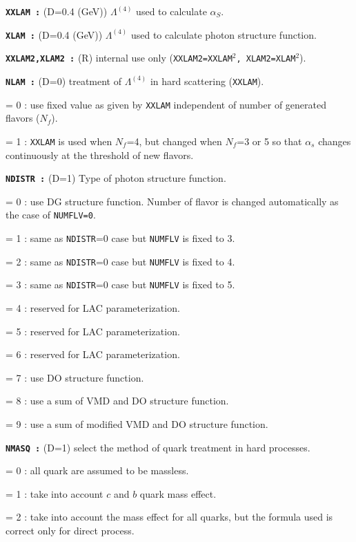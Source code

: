 \begin{list}{ }{\parsep=0pt \itemsep=0pt \topsep=0pt }
\item[\bf \tt XXLAM :] (D=0.4 (GeV)) $\Lambda^{(4)}$ used to
calculate  $\alpha_S$.

\item[\bf \tt XLAM :] (D=0.4 (GeV)) $\Lambda^{(4)}$ used to
calculate  photon structure function.

\item[\bf \tt XXLAM2,XLAM2 :] (R) internal use only
({\tt XXLAM2=XXLAM$^2$, XLAM2=XLAM$^2$}).

\item[\bf \tt NLAM :] (D=0) treatment of $\Lambda^{(4)}$ in hard
scattering ({\tt XXLAM}).
  \begin{list}{}{\itemsep=0pt \parsep=0pt \topsep=0pt}
  \item[= 0 :] use fixed value as given by {\tt XXLAM} independent 
  of number of generated flavors ($N_f$).
  \item[= 1 :] {\tt XXLAM} is used when $N_f$=4, but changed when $N_f$=3 
or 5 so that $\alpha_s$ changes continuously at the threshold of 
new flavors.
  \end{list}

\item[\bf \tt NDISTR :] (D=1) Type of photon structure function.
  \begin{list}{}{\itemsep=0pt \parsep=0pt \topsep=0pt}
  \item[= 0 :] use DG structure function\cite{DG}. Number of flavor
is changed automatically as the case of {\tt NUMFLV=0}.
  \item[= 1 :] same as {\tt NDISTR}=0 case  but {\tt NUMFLV} is fixed
to 3.
  \item[= 2 :] same as {\tt NDISTR}=0 case  but {\tt NUMFLV} is fixed to 4.
  \item[= 3 :] same as {\tt NDISTR}=0 case  but {\tt NUMFLV} is fixed to 5.
  \item[= 4 :] reserved for LAC\cite{LAC} parameterization.
  \item[= 5 :] reserved for LAC\cite{LAC} parameterization.
  \item[= 6 :] reserved for LAC\cite{LAC} parameterization.
  \item[= 7 :] use DO\cite{DO} structure function.
  \item[= 8 :] use a sum of VMD and DO structure function.
  \item[= 9 :] use a sum of modified VMD and DO structure function.
  \end{list}

\item[\bf \tt NMASQ :] (D=1) select the method  of quark treatment in
hard processes.
  \begin{list}{}{\itemsep=0pt \parsep=0pt \topsep=0pt}
  \item[= 0 :] all quark are assumed to be massless.
  \item[= 1 :] take into account $c$ and $b$ quark mass effect.
  \item[= 2 :] take into account the mass effect for all quarks, but
the formula used is correct only for direct process.
  \end{list}


\end{list}
